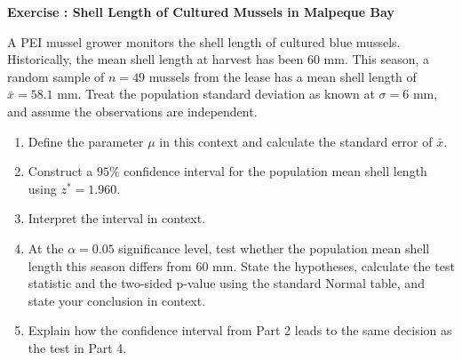 \documentclass[11pt]{article}
\newcounter{exercise}
\newcommand{\exercise}[1]{%
  \par\medskip
  \refstepcounter{exercise}%
  {\large\bfseries\color{CourseBlue} Exercise \theexercise: #1}\par\smallskip}
\begin{document}
\exercise{Shell Length of Cultured Mussels in Malpeque Bay}

A PEI mussel grower monitors the shell length of cultured blue mussels. Historically, the mean shell length at harvest has been $60$ mm. This season, a random sample of $n=49$ mussels from the lease has a mean shell length of $\bar{x}=58.1$ mm. Treat the population standard deviation as known at $\sigma=6$ mm, and assume the observations are independent.

\begin{enumerate}
  \item Define the parameter $\mu$ in this context and calculate the standard error of $\bar{x}$.
  \item Construct a $95\%$ confidence interval for the population mean shell length using $z^*=1.960$.
  \item Interpret the interval in context.
  \item At the $\alpha=0.05$ significance level, test whether the population mean shell length this season differs from $60$ mm. State the hypotheses, calculate the test statistic and the two-sided p-value using the standard Normal table, and state your conclusion in context.
  \item Explain how the confidence interval from Part 2 leads to the same decision as the test in Part 4.
\end{enumerate}
\end{document}
